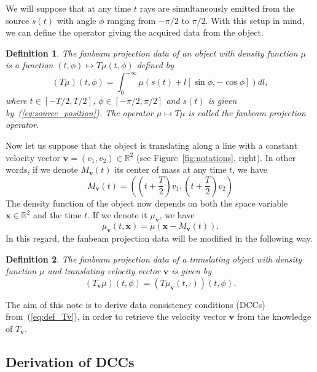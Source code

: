 \documentclass[9pt,technote]{IEEEtran}
\numberwithin{equation}{section}
\newcommand{\R}{\mathbb{R}}
\newcommand{\bx}{\mathbf{x}}
\newcommand{\bv}{\mathbf{v}}
\newcommand{\Mbv}{M_{\mathbf{v}}}
\newcommand{\Tbv}{T_{\mathbf{v}}}
\newcommand{\mubv}{\mu_{\mathbf{v}}}
\newtheorem{definition}{Definition}
\begin{document}
We will suppose that at any time $t$ rays are simultaneously emitted from the source $s(t)$ with angle $\phi$ ranging from $-\pi/2$ to $\pi/2$. With this setup in mind, we can define the operator giving the acquired data from the object.
\begin{definition}
The \emph{fanbeam projection data} of an object with density function $\mu$ is a function $(t,\phi) \mapsto T\mu(t,\phi)$ defined by
\begin{equation}
	(T\mu)(t,\phi) = \int_0^{+\infty} \mu \left( s(t) + l \left[ \sin \phi, -\cos \phi \right] \right) dl,
\end{equation}
where $t \in \left[ -T/2, T/2\right]$, $\phi \in \left[ -\pi/2, \pi/2\right]$ and $s(t)$ is given by~(\ref{eq:source_position}). The operator $\mu \mapsto T\mu$ is called the \emph{fanbeam projection operator}.
\end{definition}


Now let us suppose that the object is translating along a line with a constant velocity vector $\bv = (v_1, v_2)\in \R^2$ (see Figure~\ref{fig:notations}, right). In other words, if we denote $\Mbv(t)$ its center of mass at any time $t$, we have
\begin{equation}
	\Mbv(t) =  \left( \left( t + \frac{T}{2} \right)v_1, \left( t + \frac{T}{2} \right)v_2 \right)
\label{eq:center_of_mass}
\end{equation}
The density function of the object now depends on both the space variable $\bx \in \R^2$ and the time $t$. If we denote it $\mubv$, we have
\begin{equation}
	\mubv(t,\bx) = \mu\left( \bx - \Mbv(t)\right).
\end{equation}
In this regard, the fanbeam projection data will be modified in the following way.
\begin{definition}
The \emph{fanbeam projection data of a translating object} with density function $\mu$ and translating velocity vector $\bv$ is given by
\begin{equation}
	(\Tbv\mu)(t,\phi) = \left( T \mubv(t,\cdot) \right)(t,\phi).
\label{eq:def_Tv}
\end{equation}
\end{definition}

The aim of this note is to derive data consistency conditions (DCCs) from~(\ref{eq:def_Tv}), in order to retrieve the velocity vector $\bv$ from the knowledge of $\Tbv$.

\subsection{Derivation of DCCs}
\end{document}
